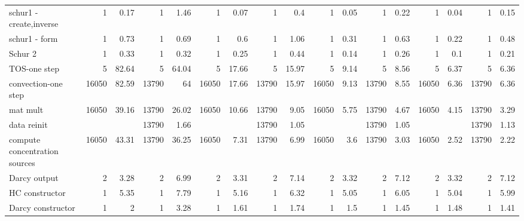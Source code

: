 \begin{sidewaystable}[!htbp]
\begin{tabular}{|l|r|r|r|r|r|r|r|r|r|r|r|r|r|r|r|r|}
    schur1 - create,inverse         &   1   &   0.17    &   1   &   1.46    &   1   &   0.07    &   1   &   0.4 &   1   &   0.05    &   1   &   0.22    &   1   &   0.04    &   1   &   0.15    \\
    schur1 - form                   &   1   &   0.73    &   1   &   0.69    &   1   &   0.6 &   1   &   1.06    &   1   &   0.31    &   1   &   0.63    &   1   &   0.22    &   1   &   0.48    \\
   Schur 2                            &   1   &   0.33    &   1   &   0.32    &   1   &   0.25    &   1   &   0.44    &   1   &   0.14    &   1   &   0.26    &   1   &   0.1 &   1   &   0.21    \\
  TOS-one step                        &   5   &   82.64   &   5   &   64.04   &   5   &   17.66   &   5   &   15.97   &   5   &   9.14    &   5   &   8.56    &   5   &   6.37    &   5   &   6.36    \\
   convection-one step               &   16050   &   82.59   &   13790   &   64  &   16050   &   17.66   &   13790   &   15.97   &   16050   &   9.13    &   13790   &   8.55    &   16050   &   6.36    &   13790   &   6.36    \\
    mat mult                        &   16050   &   39.16   &   13790   &   26.02   &   16050   &   10.66   &   13790   &   9.05    &   16050   &   5.75    &   13790   &   4.67    &   16050   &   4.15    &   13790   &   3.29    \\
    data reinit                     &           &           &   13790   &   1.66    &           &           &   13790   &   1.05    &           &           &   13790   &   1.05    &           &           &   13790   &   1.13    \\
    compute concentration sources   &   16050   &   43.31   &   13790   &   36.25   &   16050   &   7.31    &   13790   &   6.99    &   16050   &   3.6 &   13790   &   3.03    &   16050   &   2.52    &   13790   &   2.22    \\
  Darcy output                         &   2   &   3.28    &   2   &   6.99    &   2   &   3.31    &   2   &   7.14    &   2   &   3.32    &   2   &   7.12    &   2   &   3.32    &   2   &   7.12    \\
 HC constructor                         &   1   &   5.35    &   1   &   7.79    &   1   &   5.16    &   1   &   6.32    &   1   &   5.05    &   1   &   6.05    &   1   &   5.04    &   1   &   5.99    \\
  Darcy constructor                   &   1   &   2   &   1   &   3.28    &   1   &   1.61    &   1   &   1.74    &   1   &   1.5 &   1   &   1.45    &   1   &   1.48    &   1   &   1.41    \\

\end{tabular}
\end{sidewaystable}
